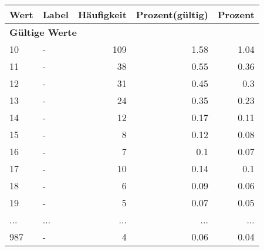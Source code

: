      \begin{longtable}{lXrrr}
     \toprule
     \textbf{Wert} & \textbf{Label} & \textbf{Häufigkeit} & \textbf{Prozent(gültig)} & \textbf{Prozent} \\
     \endhead
     \midrule
     \multicolumn{5}{l}{\textbf{Gültige Werte}}\\
        10 & \multicolumn{1}{X}{-} & %
          \num{109} &
          \num[round-mode=places,round-precision=2]{1.58} &
          \num[round-mode=places,round-precision=2]{1.04} \\
        11 & \multicolumn{1}{X}{-} & %
          \num{38} &
          \num[round-mode=places,round-precision=2]{0.55} &
          \num[round-mode=places,round-precision=2]{0.36} \\
        12 & \multicolumn{1}{X}{-} & %
          \num{31} &
          \num[round-mode=places,round-precision=2]{0.45} &
          \num[round-mode=places,round-precision=2]{0.3} \\
        13 & \multicolumn{1}{X}{-} & %
          \num{24} &
          \num[round-mode=places,round-precision=2]{0.35} &
          \num[round-mode=places,round-precision=2]{0.23} \\
        14 & \multicolumn{1}{X}{-} & %
          \num{12} &
          \num[round-mode=places,round-precision=2]{0.17} &
          \num[round-mode=places,round-precision=2]{0.11} \\
        15 & \multicolumn{1}{X}{-} & %
          \num{8} &
          \num[round-mode=places,round-precision=2]{0.12} &
          \num[round-mode=places,round-precision=2]{0.08} \\
        16 & \multicolumn{1}{X}{-} & %
          \num{7} &
          \num[round-mode=places,round-precision=2]{0.1} &
          \num[round-mode=places,round-precision=2]{0.07} \\
        17 & \multicolumn{1}{X}{-} & %
          \num{10} &
          \num[round-mode=places,round-precision=2]{0.14} &
          \num[round-mode=places,round-precision=2]{0.1} \\
        18 & \multicolumn{1}{X}{-} & %
          \num{6} &
          \num[round-mode=places,round-precision=2]{0.09} &
          \num[round-mode=places,round-precision=2]{0.06} \\
        19 & \multicolumn{1}{X}{-} & %
          \num{5} &
          \num[round-mode=places,round-precision=2]{0.07} &
          \num[round-mode=places,round-precision=2]{0.05} \\
       ... & ... & ... & ... & ... \\
        987 & \multicolumn{1}{X}{-} & %
          \num{4} &
          \num[round-mode=places,round-precision=2]{0.06} &
          \num[round-mode=places,round-precision=2]{0.04} \\


\end{longtable}
